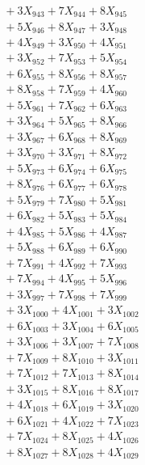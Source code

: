 \documentclass[a4paper,10pt]{article}
\begin{document}
{\begin{align}
&\;  + 3 X_{943} + 7 X_{944} + 8 X_{945} \\[0.3ex]
&\;  + 5 X_{946} + 8 X_{947} + 3 X_{948} \\[0.3ex]
&\;  + 4 X_{949} + 3 X_{950} + 4 X_{951} \\[0.3ex]
&\;  + 3 X_{952} + 7 X_{953} + 5 X_{954} \\[0.3ex]
&\;  + 6 X_{955} + 8 X_{956} + 8 X_{957} \\[0.3ex]
&\;  + 8 X_{958} + 7 X_{959} + 4 X_{960} \\[0.3ex]
&\;  + 5 X_{961} + 7 X_{962} + 6 X_{963} \\[0.3ex]
&\;  + 3 X_{964} + 5 X_{965} + 8 X_{966} \\[0.3ex]
&\;  + 3 X_{967} + 6 X_{968} + 8 X_{969} \\[0.5ex]\allowbreak
&\;  + 3 X_{970} + 3 X_{971} + 8 X_{972} \\[0.3ex]
&\;  + 5 X_{973} + 6 X_{974} + 6 X_{975} \\[0.3ex]
&\;  + 8 X_{976} + 6 X_{977} + 6 X_{978} \\[0.3ex]
&\;  + 5 X_{979} + 7 X_{980} + 5 X_{981} \\[0.3ex]
&\;  + 6 X_{982} + 5 X_{983} + 5 X_{984} \\[0.3ex]
&\;  + 4 X_{985} + 5 X_{986} + 4 X_{987} \\[0.3ex]
&\;  + 5 X_{988} + 6 X_{989} + 6 X_{990} \\[0.3ex]
&\;  + 7 X_{991} + 4 X_{992} + 7 X_{993} \\[0.3ex]
&\;  + 7 X_{994} + 4 X_{995} + 5 X_{996} \\[0.3ex]
&\;  + 3 X_{997} + 7 X_{998} + 7 X_{999} \\[0.5ex]\allowbreak
&\;  + 3 X_{1000} + 4 X_{1001} + 3 X_{1002} \\[0.3ex]
&\;  + 6 X_{1003} + 3 X_{1004} + 6 X_{1005} \\[0.3ex]
&\;  + 3 X_{1006} + 3 X_{1007} + 7 X_{1008} \\[0.3ex]
&\;  + 7 X_{1009} + 8 X_{1010} + 3 X_{1011} \\[0.3ex]
&\;  + 7 X_{1012} + 7 X_{1013} + 8 X_{1014} \\[0.3ex]
&\;  + 3 X_{1015} + 8 X_{1016} + 8 X_{1017} \\[0.3ex]
&\;  + 4 X_{1018} + 6 X_{1019} + 3 X_{1020} \\[0.3ex]
&\;  + 6 X_{1021} + 4 X_{1022} + 7 X_{1023} \\[0.3ex]
&\;  + 7 X_{1024} + 8 X_{1025} + 4 X_{1026} \\[0.3ex]
&\;  + 8 X_{1027} + 8 X_{1028} + 4 X_{1029} \\[0.5ex]\allowbreak

\end{align}}
\end{document}
